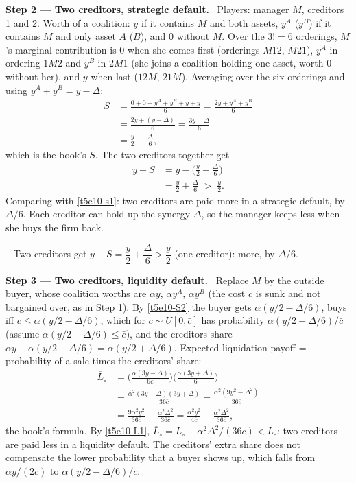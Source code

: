 \documentclass[11pt,a4paper]{article}
\newcommand{\step}[2]{\par\medskip\noindent\textbf{Step #1 --- #2.}~}
\newcommand{\answer}[1]{\par\smallskip\noindent\fbox{\textbf{Answer #1.}}~}
\begin{document}
\step{2}{Two creditors, strategic default} Players: manager $M$, creditors 1 and 2. Worth of a coalition: $y$ if it contains $M$ and both assets,
$y^A$ ($y^B$) if it contains $M$ and only asset $A$ ($B$), and 0 without $M$. Over the $3!=6$ orderings, $M$'s marginal contribution is 0
when she comes first (orderings $M12$, $M21$), $y^A$ in ordering $1M2$ and $y^B$ in $2M1$ (she joins a
coalition holding one asset, worth 0 without her), and $y$ when last ($12M$, $21M$). Averaging over the six
orderings and using $y^A+y^B=y-\Delta$:
\begin{align}
  S &= \frac{0+0+y^A+y^B+y+y}{6} = \frac{2y+y^A+y^B}{6} \nonumber\\
    &= \frac{2y+(y-\Delta)}{6} = \frac{3y-\Delta}{6} \nonumber\\
    &= \frac{y}{2}-\frac{\Delta}{6}, \label{t5e10-S2}
\end{align}
which is the book's $S$. The two creditors together get
\begin{align}
  y-S &= y-\Big(\frac{y}{2}-\frac{\Delta}{6}\Big) \nonumber\\
      &= \frac{y}{2}+\frac{\Delta}{6} \;>\; \frac{y}{2}. \label{t5e10-s2}
\end{align}
Comparing with \eqref{t5e10-s1}: two creditors are paid more in a strategic default, by $\Delta/6$. Each creditor can hold up the synergy $\Delta$,
so the manager keeps less when she buys the firm back.

\answer{(strategic)} Two creditors get $y-S=\dfrac y2+\dfrac\Delta6>\dfrac y2$ (one creditor): more, by
$\Delta/6$.

\step{3}{Two creditors, liquidity default} Replace $M$ by the outside buyer, whose coalition worths are $\alpha y$, $\alpha y^A$, $\alpha y^B$
(the cost $c$ is sunk and not bargained over, as in Step 1). By \eqref{t5e10-S2} the buyer gets $\alpha(y/2-\Delta/6)$, buys iff
$c\le\alpha(y/2-\Delta/6)$, which for $c\sim U[0,\bar c]$ has probability $\alpha(y/2-\Delta/6)/\bar c$
(assume $\alpha(y/2-\Delta/6)\le\bar c$), and the creditors share $\alpha y-\alpha(y/2-\Delta/6)=\alpha(y/2+\Delta/6)$.
Expected liquidation payoff = probability of a sale times the creditors' share:
\begin{align}
  \overline L_\circ &= \Big(\frac{\alpha(3y-\Delta)}{6\bar c}\Big)\Big(\frac{\alpha(3y+\Delta)}{6}\Big) \nonumber\\
                    &= \frac{\alpha^2(3y-\Delta)(3y+\Delta)}{36\bar c} = \frac{\alpha^2(9y^2-\Delta^2)}{36\bar c} \nonumber\\
                    &= \frac{9\alpha^2y^2}{36\bar c}-\frac{\alpha^2\Delta^2}{36\bar c}
                     = \frac{\alpha^2y^2}{4\bar c}-\frac{\alpha^2\Delta^2}{36\bar c}, \label{t5e10-L2}
\end{align}
the book's formula. By \eqref{t5e10-L1}, $\overline L_\circ=L_\circ-\alpha^2\Delta^2/(36\bar c)<L_\circ$: two creditors are paid less in a liquidity
default. The creditors' extra share does not compensate the lower probability that a buyer shows up, which falls
from $\alpha y/(2\bar c)$ to $\alpha(y/2-\Delta/6)/\bar c$.
\end{document}
